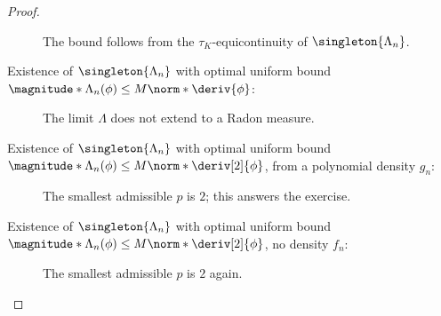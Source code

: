 \begin{proof}
\begin{description}
{    The bound follows from the $\tau_K$-equicontinuity of $\singleton{\Lambda_n}$.
  }
  \item[{Existence of $\singleton{\Lambda_n}$ with optimal uniform bound %
    $\magnitude*{\Lambda_n(\phi)}\leq M\norm*{\deriv{\phi}}$:}]{%
    The limit $\Lambda$ does not extend to a Radon measure.
  }
  \item[{Existence of $\singleton{\Lambda_n}$ with optimal uniform bound %
    $\magnitude*{\Lambda_n(\phi)}\leq M\norm*{\deriv[2]{\phi}}$, from a polynomial density $g_n$:}]{%
    The smallest admissible $p$ is $2$; this answers the exercise.}
  \item[{Existence of $\singleton{\Lambda_n}$ with optimal uniform bound %
    $\magnitude*{\Lambda_n(\phi)}\leq M\norm*{\deriv[2]{\phi}}$, no density $f_n$:}]{%
    The smallest admissible $p$ is $2$ again.}
\end{description}
%

\end{proof}

